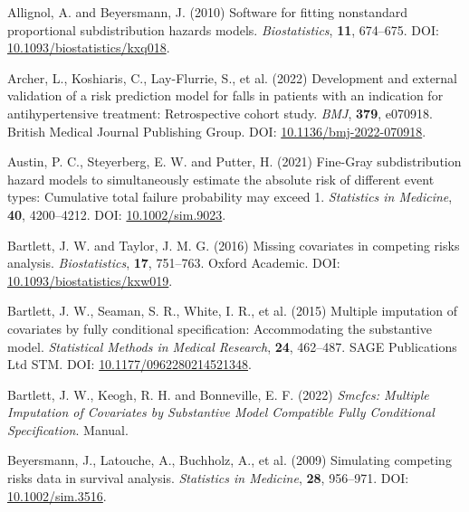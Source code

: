 \documentclass[
  letterpaper,
  DIV=11,
  numbers=noendperiod]{scrreprt}
\newlength{\cslhangindent}
\newlength{\cslentryspacingunit} %
\newenvironment{CSLReferences}[2] %
 {%
  \setlength{\parindent}{0pt}
  \ifodd #1
  \let\oldpar\par
  \def\par{\hangindent=\cslhangindent\oldpar}
  \fi
  \setlength{\parskip}{#2\cslentryspacingunit}
 }%
 {}
\begin{document}
\hypertarget{refs-4}{}
\begin{CSLReferences}{1}{0}
\leavevmode{}%
Allignol, A. and Beyersmann, J. (2010) Software for fitting nonstandard
proportional subdistribution hazards models. \emph{Biostatistics},
\textbf{11}, 674--675. DOI:
\href{https://doi.org/10.1093/biostatistics/kxq018}{10.1093/biostatistics/kxq018}.

\leavevmode{}%
Archer, L., Koshiaris, C., Lay-Flurrie, S., et al. (2022) Development
and external validation of a risk prediction model for falls in patients
with an indication for antihypertensive treatment: Retrospective cohort
study. \emph{BMJ}, \textbf{379}, e070918. British Medical Journal
Publishing Group. DOI:
\href{https://doi.org/10.1136/bmj-2022-070918}{10.1136/bmj-2022-070918}.

\leavevmode{}%
Austin, P. C., Steyerberg, E. W. and Putter, H. (2021) Fine-{Gray}
subdistribution hazard models to simultaneously estimate the absolute
risk of different event types: {Cumulative} total failure probability
may exceed 1. \emph{Statistics in Medicine}, \textbf{40}, 4200--4212.
DOI: \href{https://doi.org/10.1002/sim.9023}{10.1002/sim.9023}.

\leavevmode{}%
Bartlett, J. W. and Taylor, J. M. G. (2016) Missing covariates in
competing risks analysis. \emph{Biostatistics}, \textbf{17}, 751--763.
Oxford Academic. DOI:
\href{https://doi.org/10.1093/biostatistics/kxw019}{10.1093/biostatistics/kxw019}.

\leavevmode{}%
Bartlett, J. W., Seaman, S. R., White, I. R., et al. (2015) Multiple
imputation of covariates by fully conditional specification:
{Accommodating} the substantive model. \emph{Statistical Methods in
Medical Research}, \textbf{24}, 462--487. SAGE Publications Ltd STM.
DOI:
\href{https://doi.org/10.1177/0962280214521348}{10.1177/0962280214521348}.

\leavevmode{}%
Bartlett, J. W., Keogh, R. H. and Bonneville, E. F. (2022) \emph{Smcfcs:
{Multiple} Imputation of Covariates by Substantive Model Compatible
Fully Conditional Specification}. Manual.

\leavevmode{}%
Beyersmann, J., Latouche, A., Buchholz, A., et al. (2009) Simulating
competing risks data in survival analysis. \emph{Statistics in
Medicine}, \textbf{28}, 956--971. DOI:
\href{https://doi.org/10.1002/sim.3516}{10.1002/sim.3516}.


\end{CSLReferences}
\end{document}
